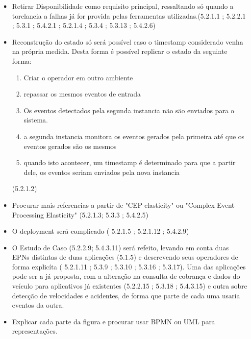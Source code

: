 \begin{itemize}
\item Retirar Disponibilidade como requisito principal, ressaltando só quando a torelancia a falhas já for provida pelas ferramentas utilizadas.(5.2.1.1 ; 5.2.2.1 ; 5.3.1 ; 5.4.2.1 ; 5.2.1.4 ; 5.3.4 ; 5.3.13 ; 5.4.2.6)
\item Reconstrução do estado só será possível caso o timestamp considerado venha na própria medida. Desta forma é possível replicar o estado da seguinte forma:
\begin{enumerate}
\item Criar o operador em outro ambiente
\item repassar os mesmos eventos de entrada
\item Os eventos detectados pela segunda instancia não são enviados para o sistema.
\item a segunda instancia monitora os eventos gerados pela primeira até que os eventos gerados são os mesmos
\item quando isto acontecer, um timestamp é determinado para que a partir dele, os eventos seriam enviados pela nova instancia
\end{enumerate}
(5.2.1.2)

\item Procurar mais referencias a partir de "CEP elasticity" ou "Complex Event Processing Elasticity" (5.2.1.3; 5.3.3 ; 5.4.2.5)

\item O deployment será complicado ( 5.2.1.5 ; 5.2.1.12 ; 5.4.2.9)
\item O Estudo de Caso (5.2.2.9; 5.4.3.11) será refeito, levando em conta duas EPNs distintas de duas aplicações (5.1.5) e descrevendo seus operadores de forma explicíta ( 5.2.1.11 ; 5.3.9 ; 5.3.10 ; 5.3.16 ; 5.3.17). Uma das aplicações pode ser a já proposta, com a alteração na consulta de cobrança e dados do veículo para aplicativos já existentes (5.2.2.15 ; 5.3.18 ; 5.4.3.15) e outra sobre detecção de velocidades e acidentes, de forma que parte de cada uma usaria eventos da outra.
\item Explicar cada parte da figura e procurar usar BPMN ou UML para representações.


\end{itemize}
